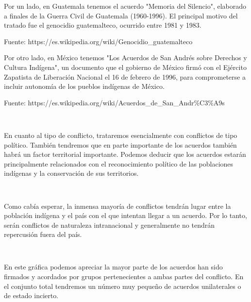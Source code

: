 \documentclass[11pt]{article}
\begin{document}
Por un lado, en Guatemala tenemos el acuerdo "Memoria del Silencio",
elaborado a finales de la Guerra Civil de Guatemala (1960-1996). El
principal motivo del tratado fue el genocidio guatemalteco, ocurrido
entre 1981 y 1983.

Fuente: https://es.wikipedia.org/wiki/Genocidio\_guatemalteco

Por otro lado, en México tenemos "Los Acuerdos de San Andrés sobre
Derechos y Cultura Indígena", un documento que el gobierno de México
firmó con el Ejército Zapatista de Liberación Nacional el 16 de febrero
de 1996, para comprometerse a incluir autonomía de los pueblos indígenas
de México.

Fuente: https://es.wikipedia.org/wiki/Acuerdos\_de\_San\_Andr\%C3\%A9s

    \begin{center}
    \end{center}
    { \hspace*{\fill} \\}
    
    En cuanto al tipo de conflicto, trataremos esencialmente con conflictos
de tipo político. También tendremos que en parte importante de los acuerdos
también habrá un factor territorial importante. Podemos deducir que los
acuerdos estarán principalmente relacionados con el reconocimiento
político de las poblaciones indígenas y la conservación de sus
territorios.
        
    \begin{center}
    \end{center}
    { \hspace*{\fill} \\}
    
    Como cabía esperar, la inmensa mayoría de conflictos tendrán lugar entre
la población indígena y el país con el que intentan llegar a un acuerdo.
Por lo tanto, serán conflictos de naturaleza intranacional y
generalmente no tendrán repercusión fuera del país.
        
    \begin{center}
    \end{center}
    { \hspace*{\fill} \\}
    
    En este gráfica podemos apreciar la mayor parte de los acuerdos han sido
firmados y acordados por grupos pertenecientes a ambas partes del
conflicto. En el conjunto total tendremos un número muy pequeño de
acuerdos unilaterales o de estado incierto.
        
\end{document}

